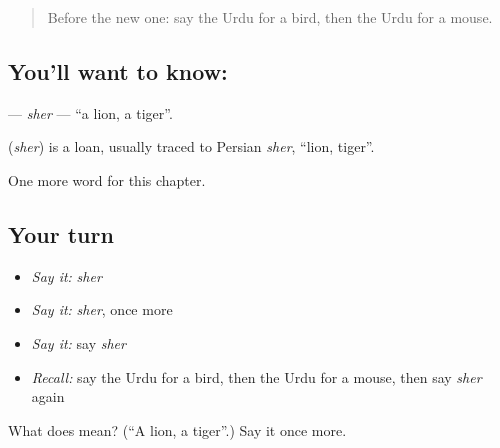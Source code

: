 \begin{quote}
Before the new one: say the Urdu for a bird, then the Urdu for a mouse.
\end{quote}

\subsection*{You'll want to know: }
\textbf{} — \emph{sher} — \textquotedblleft{}a lion, a tiger\textquotedblright{}.

\begin{cousinweb}
\textbf{} (\emph{sher}) is a loan, usually traced to Persian \emph{sher}, \textquotedblleft{}lion, tiger\textquotedblright{}.
\end{cousinweb}

\begin{grammarlens}[title={What you've built}]
One more word for this chapter.
\end{grammarlens}

\subsection*{Your turn}
\begin{itemize}
\raggedright
  \item \emph{Say it:} \emph{sher}
  \item \emph{Say it:} \emph{sher}, once more
  \item \emph{Say it:} say \emph{sher}
  \item \emph{Recall:} say the Urdu for a bird, then the Urdu for a mouse, then say \emph{sher} again
\end{itemize}

\begin{tcolorbox}[breakable,colback=teal!4,colframe=teal!35!black,title={Before you move on}]
What does  mean? (\textquotedblleft{}A lion, a tiger\textquotedblright{}.) Say it once more.
\end{tcolorbox}
